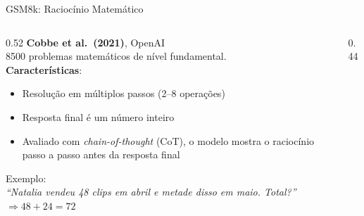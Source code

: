 \documentclass[aspectratio=169, xcolor=dvipsnames]{beamer}
\begin{document}
  \begin{frame}{GSM8k: Raciocínio Matemático \cite{cobbe2021gsm8k}}
    \begin{columns}[T]
      \begin{column}{0.52\textwidth}
        \textbf{Cobbe et al.\ (2021)}, OpenAI\\[0.4em]
        8500 problemas matemáticos de nível fundamental.\\[0.4em]
        \textbf{Características}:
        \begin{itemize}
          \item Resolução em múltiplos passos (2--8 operações)
          \item Resposta final é um número inteiro
          \item Avaliado com \textit{chain-of-thought} (CoT){\footnotesize, o modelo mostra o raciocínio passo a passo antes da resposta final}
        \end{itemize}
        Exemplo:\\
        \textit{``Natalia vendeu 48 clips em abril e metade disso em maio. Total?''}
        $\Rightarrow 48 + 24 = 72$
      \end{column}
      \begin{column}{0.44\textwidth}
      \end{column}
    \end{columns}
  \end{frame}
\end{document}

